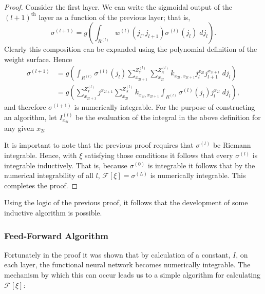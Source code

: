 \begin{proof}
Consider the first layer. We can write the sigmoidal output of the $(l+1)^{\mathrm{th}}$ layer as a function of the previous layer; that is,
\begin{equation}
\sigma^{(l+1)} = g\left(\int_{R^{(l)}} w^{(l)}(j_l, j_{l+1})\sigma^{(l)}(j_{l})\; dj_{l}\right).
\end{equation}
Clearly this composition can be expanded using the polynomial definition of the weight surface. Hence
\begin {equation}
\begin{aligned}
\sigma^{(l+1)} &= g\left(\int_{R^{(l)}}\sigma^{(l)}(j_l)\sum_{x_{2l+1}}^{Z^{(l)}_Y}\sum_{x_{2l}}^{Z^{(l)}_X}{k_{x_{2l},x_{2l+1}}j_l^{x_{2l}}j_{l+1}^{x_{2l+1}}\;dj_l}\right) \\
&= g\left(\sum_{x_{2l+1}}^{Z^{(l)}_Y}j^{x_{2l+1}}\sum_{x_{2l}}^{Z^{(l)}_X}{k_{x_{2l},x_{2l+1}}}\int_{R^{(l)}} \sigma^{(l)}(j_l)j_l^{x_{2l}}\; dj_l\right),
\end{aligned}
\end{equation}
and therefore $\sigma^{(l+1)}$ is numerically integrable. For the purpose of constructing an algorithm, let $I^{(l)}_{x_{2l}}$ be the evaluation of the integral in the above definition for any given $x_{2l}$

It is important to note that the previous proof requires that $\sigma^{(l)}$ be Riemann integrable. Hence, with $\xi$ satisfying those conditions it follows that every $\sigma^{(l)}$ is integrable inductively. That is, because $\sigma^{(0)}$ is integrable it follows that by the numerical integrability of all $l$, $\mathcal{F}[\xi] = \sigma^{(L)}$ is numerically integrable. This completes the proof.
\end{proof}
Using the logic of the previous proof, it follows that the development of some inductive algorithm is possible. 

    
    \subsubsection{Feed-Forward Algorithm}
    Fortunately in the proof it was shown that by calculation of a constant, $I$, on each layer, the functional neural network becomes numerically integrable. The mechanism by which this can occur leads us to a simple algorithm for calculating
    $\mathcal{F}[\xi]$:
    
